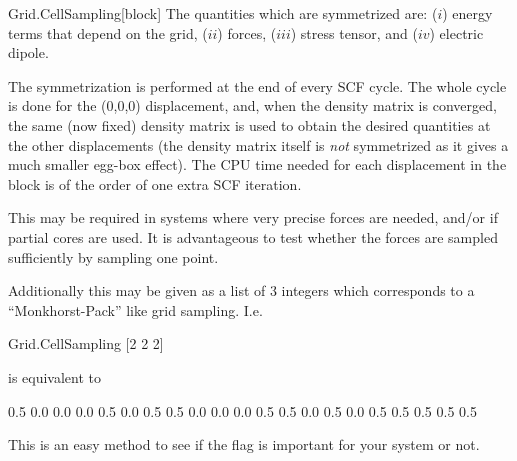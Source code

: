 \begin{fdfentry}{Grid.CellSampling}[block]
  The quantities which are symmetrized are: ($i$) energy terms that
  depend on the grid, ($ii$) forces, ($iii$) stress tensor, and ($iv$)
  electric dipole.

  The symmetrization is performed at the end of every SCF cycle. The
  whole cycle is done for the (0,0,0) displacement, and, when the
  density matrix is converged, the same (now fixed) density matrix is
  used to obtain the desired quantities at the other displacements
  (the density matrix itself is \emph{not} symmetrized as it gives a
  much smaller egg-box effect). The CPU time needed for each
  displacement in the  block is of the order
  of one extra SCF iteration.

  This may be required in systems where very precise forces are needed,
  and/or if partial cores are used. It is advantageous to test whether
  the forces are sampled sufficiently by sampling one point.

  Additionally this may be given as a list of 3 integers which
  corresponds to a ``Monkhorst-Pack'' like grid sampling. I.e.
  \begin{fdfexample}
     Grid.CellSampling [2 2 2]
  \end{fdfexample}
  is equivalent to
  \begin{fdfexample}
        0.5    0.0    0.0
        0.0    0.5    0.0
        0.5    0.5    0.0
        0.0    0.0    0.5
        0.5    0.0    0.5
        0.0    0.5    0.5
        0.5    0.5    0.5
  \end{fdfexample}
  This is an easy method to see if the flag is important for your
  system or not.

\end{fdfentry}

